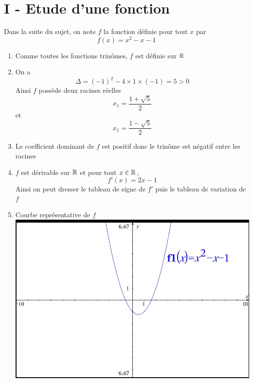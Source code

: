 
\usepackage{tkz-tab}



\flushleft
\section*{I - Etude d'une fonction}
Dans la suite du sujet, on note $f$ la fonction définie pour tout $x$ par $$f(x) = x^2-x-1$$
\begin{enumerate}
\item Comme toutes les fonctions trinômes, $f$ est définie sur $\mathbb{R}$
\item On a $$\Delta = (-1)^2 -4 \times 1 \times (-1) = 5 > 0$$ Ainsi $f$ possède deux racines réelles $$x_1 = \dfrac{1 + \sqrt{5}}{2}$$ et $$x_1 = \dfrac{1 - \sqrt{5}}{2}$$ 
\item Le coefficient dominant de $f$ est positif donc le trinôme est négatif entre les racines 
\item $f$ est dérivable sur $\mathbb{R}$ et pour tout $x\in \mathbb{R}$, $$f'(x) =  2x-1$$
Ainsi on peut dresser le tableau de signe de $f'$ puis le tableau de variation de $f$\newline
{}\newline
\item Courbe représentative de $f$ \newline\includegraphics[scale=0.3]{fibo_ill1.jpg} 

\end{enumerate}
